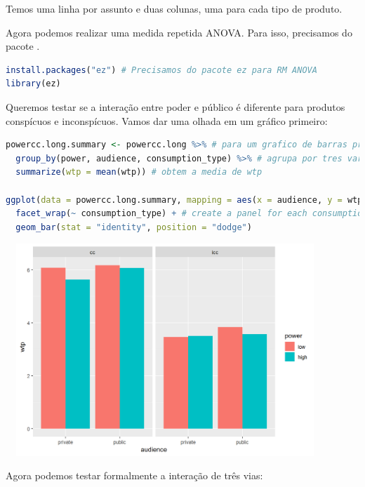 \documentclass{article}
\begin{document}
Temos uma linha por assunto e duas colunas, uma para cada tipo de produto.

Agora podemos realizar uma medida repetida ANOVA. Para isso, precisamos do pacote .

\begin{lstlisting}[language=R]
install.packages("ez") # Precisamos do pacote ez para RM ANOVA
library(ez)

\end{lstlisting}

Queremos testar se a interação entre poder e público é diferente para produtos conspícuos e inconspícuos. Vamos dar uma olhada em um gráfico primeiro:

\begin{lstlisting}[language=R]
powercc.long.summary <- powercc.long %>% # para um grafico de barras precisamos de summary primeiro
  group_by(power, audience, consumption_type) %>% # agrupa por tres variaveis independentes
  summarize(wtp = mean(wtp)) # obtem a media de wtp

ggplot(data = powercc.long.summary, mapping = aes(x = audience, y = wtp, fill = power)) + 
  facet_wrap(~ consumption_type) + # create a panel for each consumption type
  geom_bar(stat = "identity", position = "dodge")
\end{lstlisting}


\begin{center}
\includegraphics[width=12cm,height=8cm]{bda_rmanova_graph-1.png}
\end{center}

Agora podemos testar formalmente a interação de três vias:
\end{document}
